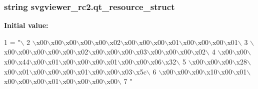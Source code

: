 \subsubsection[{qt\+\_\+resource\+\_\+struct}]{\setlength{\rightskip}{0pt plus 5cm}string svgviewer\+\_\+rc2.\+qt\+\_\+resource\+\_\+struct}\label{namespacesvgviewer__rc2_a76272cb3c93a90dc567d1bfcd045605f}
{\bfseries Initial value\+:}
\begin{DoxyCode}
1 = \textcolor{stringliteral}{"\(\backslash\)}
2 \textcolor{stringliteral}{\(\backslash\)x00\(\backslash\)x00\(\backslash\)x00\(\backslash\)x00\(\backslash\)x00\(\backslash\)x02\(\backslash\)x00\(\backslash\)x00\(\backslash\)x00\(\backslash\)x01\(\backslash\)x00\(\backslash\)x00\(\backslash\)x00\(\backslash\)x01\(\backslash\)}
3 \textcolor{stringliteral}{\(\backslash\)x00\(\backslash\)x00\(\backslash\)x00\(\backslash\)x00\(\backslash\)x00\(\backslash\)x02\(\backslash\)x00\(\backslash\)x00\(\backslash\)x00\(\backslash\)x03\(\backslash\)x00\(\backslash\)x00\(\backslash\)x00\(\backslash\)x02\(\backslash\)}
4 \textcolor{stringliteral}{\(\backslash\)x00\(\backslash\)x00\(\backslash\)x00\(\backslash\)x44\(\backslash\)x00\(\backslash\)x01\(\backslash\)x00\(\backslash\)x00\(\backslash\)x00\(\backslash\)x01\(\backslash\)x00\(\backslash\)x00\(\backslash\)x06\(\backslash\)x32\(\backslash\)}
5 \textcolor{stringliteral}{\(\backslash\)x00\(\backslash\)x00\(\backslash\)x00\(\backslash\)x28\(\backslash\)x00\(\backslash\)x01\(\backslash\)x00\(\backslash\)x00\(\backslash\)x00\(\backslash\)x01\(\backslash\)x00\(\backslash\)x00\(\backslash\)x03\(\backslash\)x5c\(\backslash\)}
6 \textcolor{stringliteral}{\(\backslash\)x00\(\backslash\)x00\(\backslash\)x00\(\backslash\)x10\(\backslash\)x00\(\backslash\)x01\(\backslash\)x00\(\backslash\)x00\(\backslash\)x00\(\backslash\)x01\(\backslash\)x00\(\backslash\)x00\(\backslash\)x00\(\backslash\)x00\(\backslash\)}
7 \textcolor{stringliteral}{"}
\end{DoxyCode}
